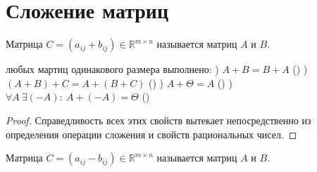 \section{Сложение матриц}
\begin{opred}
Матрица $C=\left( a_{ij}+b_{ij} \right) \in \mathbb {R}^{m\times{}n}$ называется  матриц $A$ и $B$.
\end{opred}
\begin{theor}
 любых мартиц одинакового размера выполнено:
) $A+B=B+A$ ()
) $(A+B)+C=A+(B+C)$ ()
) $A+\Theta=A$ ()
) $\forall{}A\ \exists{}(-A):\ A+(-A)=\Theta$ ()
\end{theor}
\begin{proof}
Справедливость всех этих свойств вытекает непосредственно из определения операции сложения и свойств рациональных чисел.
\end{proof}
\begin{opred}
Матрица $C=\left( a_{ij}-b_{ij} \right) \in \mathbb {R}^{m\times{}n}$ называется  матриц $A$ и $B$.
\end{opred}
